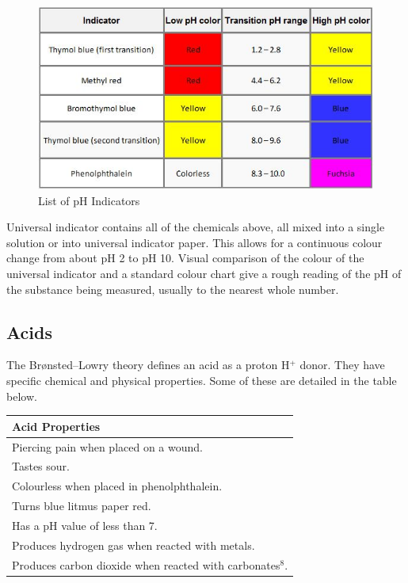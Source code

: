 \begin{figure}[H]
    \includegraphics[width=\textwidth]{./Planning/Images/Indicators.jpg}
    \caption{List of pH Indicators} \label{fig:pH Indicators}
\end{figure}

Universal indicator contains all of the chemicals above, all mixed into a single solution or into universal indicator paper. This allows for a continuous colour change from about pH 2 to pH 10. Visual comparison of the colour of the universal indicator and a standard colour chart give a rough reading of the pH of the substance being measured, usually to the nearest whole number. 


	\subsection{Acids} 

The Brønsted–Lowry theory defines an acid as a proton H$^+$ donor. They have specific chemical and physical properties. Some of these are detailed in the table below.

\begin{center}
\begin{tabular}{|l|}
    \hline
    \textbf{Acid Properties}  \\ \hline
Piercing pain when placed on a wound. \\ \hline
Tastes sour. \\ \hline
Colourless when placed in phenolphthalein. \\ \hline
Turns blue litmus paper red. \\ \hline
Has a pH value of less than 7. \\ \hline
Produces hydrogen gas when reacted with metals. \\ \hline
Produces carbon dioxide when reacted with carbonates$^8$. \\ \hline
\end{tabular}

\label{tab:Acid Properties}
\end{center}

